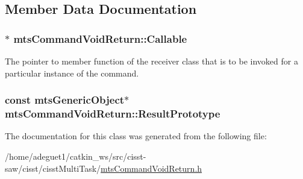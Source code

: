 \subsection{Member Data Documentation}
\hypertarget{classmts_command_void_return_a724dc0b6b5cc0a0fcc783aaa39e0ec8e}{
\subsubsection[{Callable}]{$\ast$ mts\-Command\-Void\-Return\-::\-Callable\hspace{0.3cm}{\ttfamily [protected]}}}\label{classmts_command_void_return_a724dc0b6b5cc0a0fcc783aaa39e0ec8e}
The pointer to member function of the receiver class that is to be invoked for a particular instance of the command. \hypertarget{classmts_command_void_return_aaf7b0c693d09cd4664f114b97200911d}{
\subsubsection[{Result\-Prototype}]{\setlength{\rightskip}{0pt plus 5cm}const {\bf mts\-Generic\-Object}$\ast$ mts\-Command\-Void\-Return\-::\-Result\-Prototype\hspace{0.3cm}{\ttfamily [protected]}}}\label{classmts_command_void_return_aaf7b0c693d09cd4664f114b97200911d}


The documentation for this class was generated from the following file\-:\begin{DoxyCompactItemize}
\item 
/home/adeguet1/catkin\-\_\-ws/src/cisst-\/saw/cisst/cisst\-Multi\-Task/\hyperlink{mts_command_void_return_8h}{mts\-Command\-Void\-Return.\-h}\end{DoxyCompactItemize}
